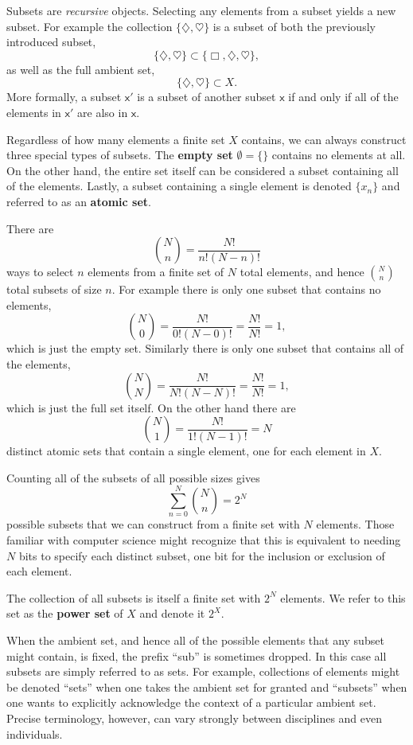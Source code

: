 \documentclass[
  letterpaper,
  DIV=11,
  numbers=noendperiod]{scrartcl}
\begin{document}
Subsets are \emph{recursive} objects. Selecting any elements from a
subset yields a new subset. For example the collection
\(\{\diamondsuit, \heartsuit\}\) is a subset of both the previously
introduced subset, \[
\{ \diamondsuit, \heartsuit \} \subset \{ \Box, \diamondsuit, \heartsuit \},
\] as well as the full ambient set, \[
\{ \diamondsuit, \heartsuit \} \subset X.
\] More formally, a subset \(\mathsf{x}'\) is a subset of another subset
\(\mathsf{x}\) if and only if all of the elements in \(\mathsf{x}'\) are
also in \(\mathsf{x}\).

Regardless of how many elements a finite set \(X\) contains, we can
always construct three special types of subsets. The \textbf{empty set}
\(\emptyset = \{\}\) contains no elements at all. On the other hand, the
entire set itself can be considered a subset containing all of the
elements. Lastly, a subset containing a single element is denoted
\(\{ x_{n} \}\) and referred to as an \textbf{atomic set}.

There are \[
{N \choose n} = \frac{ N! }{ n! (N - n)!}
\] ways to select \(n\) elements from a finite set of \(N\) total
elements, and hence \({N \choose n}\) total subsets of size \(n\). For
example there is only one subset that contains no elements, \[
{N \choose 0} = \frac{ N! }{ 0! (N - 0)!} = \frac{ N! }{ N! } = 1,
\] which is just the empty set. Similarly there is only one subset that
contains all of the elements, \[
{N \choose N} = \frac{ N! }{ N! (N - N)!} = \frac{ N! }{ N! } = 1,
\] which is just the full set itself. On the other hand there are \[
{N \choose 1} = \frac{ N! }{ 1! (N - 1)!} = N
\] distinct atomic sets that contain a single element, one for each
element in \(X\).

Counting all of the subsets of all possible sizes gives \[
\sum_{n = 0}^{N} {N \choose n} = 2^{N}
\] possible subsets that we can construct from a finite set with \(N\)
elements. Those familiar with computer science might recognize that this
is equivalent to needing \(N\) bits to specify each distinct subset, one
bit for the inclusion or exclusion of each element.

The collection of all subsets is itself a finite set with \(2^{N}\)
elements. We refer to this set as the \textbf{power set} of \(X\) and
denote it \(2^{X}\).

When the ambient set, and hence all of the possible elements that any
subset might contain, is fixed, the prefix ``sub'' is sometimes dropped.
In this case all subsets are simply referred to as sets. For example,
collections of elements might be denoted ``sets'' when one takes the
ambient set for granted and ``subsets'' when one wants to explicitly
acknowledge the context of a particular ambient set. Precise
terminology, however, can vary strongly between disciplines and even
individuals.
\end{document}
